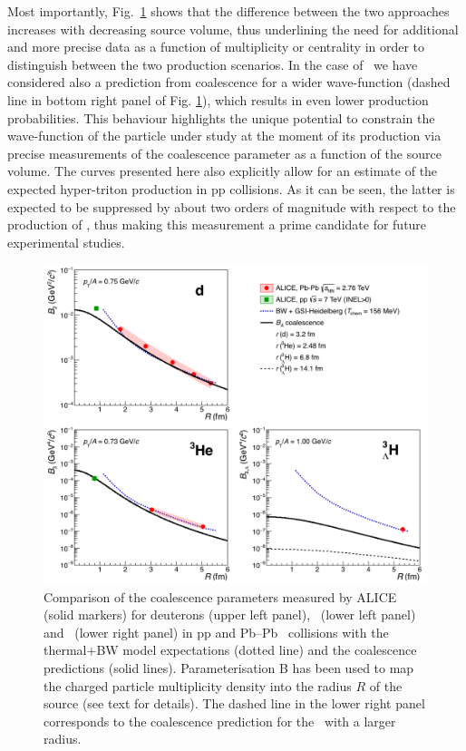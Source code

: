 \documentclass[a4paper,11pt]{scrartcl}
\begin{document}
Most importantly, Fig.~\ref{fig:CompareThermalAndCoalescence} shows that the difference between the two approaches increases with decreasing source volume, thus underlining the need for additional and more precise data as a function of multiplicity or centrality in order to distinguish between the two production scenarios. 
In the case of \hthreelambda~we have considered also a prediction from coalescence for a wider wave-function (dashed line in bottom right panel of Fig. \ref{fig:CompareThermalAndCoalescence}), which results in even lower production probabilities. This behaviour highlights the unique potential to constrain the wave-function of the particle under study at the moment of its production via precise measurements of the coalescence parameter as a function of the source volume. The curves presented here also explicitly allow for an estimate of the expected hyper-triton production in pp collisions. As it can be seen, the latter is expected to be suppressed by about two orders of magnitude with respect to the production of \hethree, thus making this measurement a prime candidate for future experimental studies.
 
\begin{figure}[htbp]
	\begin{center}
		\includegraphics[width=\textwidth]{compareThermalAndCoalescence.png}
		\caption{Comparison of the coalescence parameters measured by ALICE (solid markers) for deuterons (upper left panel), \hethree\ (lower left panel) and \hthreelambda\ (lower right panel) in pp \cite{ALICE:nucleipp2017} and Pb--Pb~\cite{ALICE:deuteronppPbPb2015, Adam:2015yta} collisions with the thermal+BW model expectations (dotted line) and the coalescence predictions (solid lines). Parameterisation B has been used to map the charged particle multiplicity density into the radius $R$ of the source (see text for details). The dashed line in the lower right panel corresponds to the coalescence prediction for the \hthreelambda\ with a larger radius.}
		\label{fig:CompareThermalAndCoalescence}
	\end{center}
\end{figure}
\end{document}
